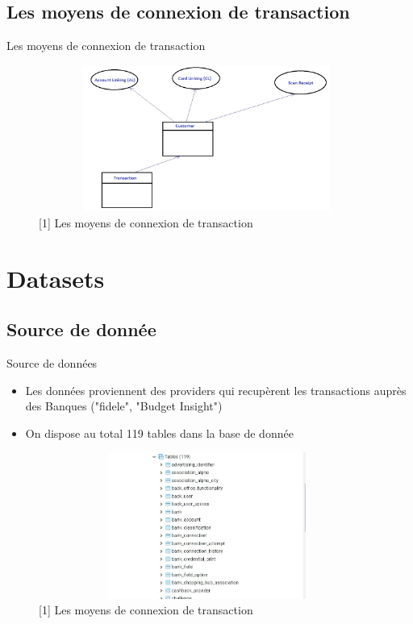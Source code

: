 \documentclass{beamer}
\begin{document}
\subsection{Les moyens de connexion de transaction}
\begin{frame}{Les moyens de connexion de transaction}
\begin{figure}[H]
    \includegraphics[width=11cm,height=4.8cm]{images/moyen_paiement.jpeg}
    \caption{[1] Les moyens de connexion de transaction}
    \label{fig:L1}
\end{figure}
\end{frame}

\section{Datasets}
\subsection{Source de donnée}
\begin{frame}{Source de données}
\begin{itemize}
		\item Les données proviennent des providers qui recupèrent les transactions auprès des Banques ("fidele", "Budget Insight")
		\item On dispose au total 119 tables dans la base de donnée
\end{itemize}
\begin{figure}[H]
    \includegraphics[width=11cm,height=4.8cm]{images/all_tables.jpeg}
    \caption{[1] Les moyens de connexion de transaction}
    \label{fig:L1}
\end{figure}
\end{frame}
\end{document}
